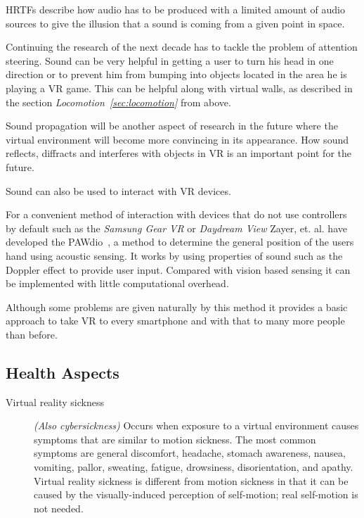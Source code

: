 HRTFs describe how audio has to be produced with a limited amount of audio sources to give the illusion that a sound is coming from a given point in space.

Continuing the research of the next decade has to tackle the problem of attention steering. Sound can be very helpful in getting a user to turn his head in one direction or to prevent him from bumping into objects located in the area he is playing a VR game. This can be helpful along with virtual walls, as described in the section \textit{Locomotion~\ref{sec:locomotion}} from above.

Sound propagation will be another aspect of research in the future where the virtual environment will become more convincing in its appearance. How sound reflects, diffracts and interferes with objects in VR is an important point for the future.

Sound can also be used to interact with VR devices.

For a convenient method of interaction with devices that do not use controllers by default such as the \textit{Samsung Gear VR} or \textit{Daydream View} Zayer, et. al. have developed the PAWdio~\cite{Zayer:2016:PHI:2967934.2968079}, a method to determine the general position of the users hand using acoustic sensing. It works by using properties of sound such as the Doppler effect to provide user input. Compared with vision based sensing it can be implemented with little computational overhead. 

Although some problems are given naturally by this method it provides a basic approach to take VR to every smartphone and with that to many more people than before.

\subsection{Health Aspects}

\begin{description}
	\item[Virtual reality sickness] \textit{(Also cybersickness)} Occurs when exposure to a virtual environment causes symptoms that are similar to motion sickness. \newline The most common symptoms are general discomfort, headache, stomach awareness, nausea, vomiting, pallor, sweating, fatigue, drowsiness, disorientation, and apathy. \newline Virtual reality sickness is different from motion sickness in that it can be caused by the visually-induced perception of self-motion; real self-motion is not needed.
\end{description}

